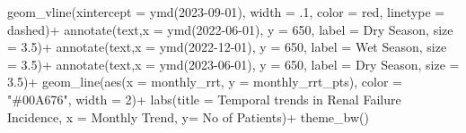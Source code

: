 \documentclass[
  letterpaper,
  DIV=11,
  numbers=noendperiod]{scrartcl}
\newenvironment{Shaded}{\begin{snugshade}}{\end{snugshade}}
\newcommand{\AttributeTok}[1]{\textcolor[rgb]{0.40,0.45,0.13}{#1}}
\newcommand{\DecValTok}[1]{\textcolor[rgb]{0.68,0.00,0.00}{#1}}
\newcommand{\FloatTok}[1]{\textcolor[rgb]{0.68,0.00,0.00}{#1}}
\newcommand{\FunctionTok}[1]{\textcolor[rgb]{0.28,0.35,0.67}{#1}}
\newcommand{\NormalTok}[1]{\textcolor[rgb]{0.00,0.23,0.31}{#1}}
\newcommand{\SpecialCharTok}[1]{\textcolor[rgb]{0.37,0.37,0.37}{#1}}
\newcommand{\StringTok}[1]{\textcolor[rgb]{0.13,0.47,0.30}{#1}}
\begin{document}
\begin{Shaded}
\begin{Highlighting}[]
  \FunctionTok{geom\_vline}\NormalTok{(}\AttributeTok{xintercept =} \FunctionTok{ymd}\NormalTok{(}\StringTok{\textquotesingle{}2023{-}09{-}01\textquotesingle{}}\NormalTok{), }\AttributeTok{width =}\NormalTok{ .}\DecValTok{1}\NormalTok{, }\AttributeTok{color =} \StringTok{\textquotesingle{}red\textquotesingle{}}\NormalTok{,}
             \AttributeTok{linetype =} \StringTok{\textquotesingle{}dashed\textquotesingle{}}\NormalTok{)}\SpecialCharTok{+}
  \FunctionTok{annotate}\NormalTok{(}\StringTok{\textquotesingle{}text\textquotesingle{}}\NormalTok{,}\AttributeTok{x =} \FunctionTok{ymd}\NormalTok{(}\StringTok{\textquotesingle{}2022{-}06{-}01\textquotesingle{}}\NormalTok{), }\AttributeTok{y =} \DecValTok{650}\NormalTok{, }\AttributeTok{label =} \StringTok{\textquotesingle{}Dry Season\textquotesingle{}}\NormalTok{, }\AttributeTok{size =} \FloatTok{3.5}\NormalTok{)}\SpecialCharTok{+}
  \FunctionTok{annotate}\NormalTok{(}\StringTok{\textquotesingle{}text\textquotesingle{}}\NormalTok{,}\AttributeTok{x =} \FunctionTok{ymd}\NormalTok{(}\StringTok{\textquotesingle{}2022{-}12{-}01\textquotesingle{}}\NormalTok{), }\AttributeTok{y =} \DecValTok{650}\NormalTok{, }\AttributeTok{label =} \StringTok{\textquotesingle{}Wet Season\textquotesingle{}}\NormalTok{, }\AttributeTok{size =} \FloatTok{3.5}\NormalTok{)}\SpecialCharTok{+}
  \FunctionTok{annotate}\NormalTok{(}\StringTok{\textquotesingle{}text\textquotesingle{}}\NormalTok{,}\AttributeTok{x =} \FunctionTok{ymd}\NormalTok{(}\StringTok{\textquotesingle{}2023{-}06{-}01\textquotesingle{}}\NormalTok{), }\AttributeTok{y =} \DecValTok{650}\NormalTok{, }\AttributeTok{label =} \StringTok{\textquotesingle{}Dry Season\textquotesingle{}}\NormalTok{, }\AttributeTok{size =} \FloatTok{3.5}\NormalTok{)}\SpecialCharTok{+}
  \FunctionTok{geom\_line}\NormalTok{(}\FunctionTok{aes}\NormalTok{(}\AttributeTok{x =}\NormalTok{ monthly\_rrt, }\AttributeTok{y =}\NormalTok{ monthly\_rrt\_pts), }\AttributeTok{color =} \StringTok{"\#00A676"}\NormalTok{, }\AttributeTok{width =} \DecValTok{2}\NormalTok{)}\SpecialCharTok{+}
  \FunctionTok{labs}\NormalTok{(}\AttributeTok{title =} \StringTok{\textquotesingle{}Temporal trends in Renal Failure Incidence\textquotesingle{}}\NormalTok{,}
       \AttributeTok{x =} \StringTok{\textquotesingle{}Monthly Trend\textquotesingle{}}\NormalTok{,}
       \AttributeTok{y=} \StringTok{\textquotesingle{}No of Patients\textquotesingle{}}\NormalTok{)}\SpecialCharTok{+}
  \FunctionTok{theme\_bw}\NormalTok{()}
\end{Highlighting}
\end{Shaded}
\end{document}
